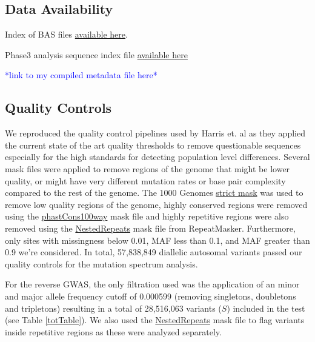 \documentclass[9pt,lineno]{elife}
\newcommand{\todo}[1]{\textcolor{blue}{*#1*}}
\begin{document}
\subsection{Data Availability}

Index of BAS files \href{http://ftp.1000genomes.ebi.ac.uk/vol1/ftp/data_collections/1000_genomes_project/1000genomes.low_coverage.GRCh38DH.alignment.index}{available here}.

Phase3 analysis sequence index file  \href{http://ftp.1000genomes.ebi.ac.uk/vol1/ftp/phase3/20130502.phase3.analysis.sequence.index}{available here} 

\todo{link to my compiled metadata file here}

\subsection{Quality Controls}
We reproduced the quality control pipelines used by Harris et. al as they applied the current state of the art quality thresholds to remove questionable sequences especially for the high standards for detecting population level differences. 
Several mask files were applied to remove regions of the genome that might be lower quality, or might have very different mutation rates or base pair complexity compared to the rest of the genome. 
The  1000 Genomes \href{http://ftp.1000genomes.ebi.ac.uk/vol1/ftp/release/20130502/supporting/accessible_genome_masks/20141020.strict_mask.whole_genome.bed}{strict mask} was used to remove low quality regions of the genome, highly conserved regions were removed using the \href{http://hgdownload.cse.ucsc.edu/goldenPath/hg19/database/phastConsElements100way.txt.gz}{phastCons100way} mask file and highly repetitive regions were also removed using the \href{http://hgdownload.cse.ucsc.edu/goldenpath/hg19/database/nestedRepeats.txt.gz}{NestedRepeats} mask file from RepeatMasker. 
Furthermore, only sites with missingness below 0.01, MAF less than 0.1, and MAF greater than 0.9 we're considered.
In total, 57,838,849 diallelic autosomal variants passed our quality controls for the mutation spectrum analysis.

For the reverse GWAS, the only filtration used was the application of an minor and major allele frequency cutoff of 0.000599 (removing singletons, doubletons and tripletons)  resulting in a total of 28,516,063 variants ($S$) included in the test (see Table \ref{totTable}). We also used the \href{http://hgdownload.cse.ucsc.edu/goldenpath/hg19/database/nestedRepeats.txt.gz}{NestedRepeats} mask file to flag variants inside repetitive regions as these were analyzed separately.
\end{document}
